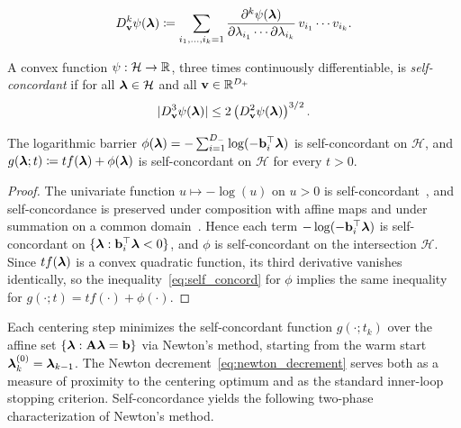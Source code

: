 \begin{equation}
	D_{\mathbf{v}}^k \psi(\boldsymbol{\lambda}) \coloneqq \sum_{i_1,\ldots,i_k=1}\frac{\partial^k\psi(\boldsymbol{\lambda})}{\partial \lambda_{i_1}\cdots \partial \lambda_{i_k}}\,v_{i_1}\cdots v_{i_k}.
\end{equation}
\begin{definition}
	A convex function $\psi:\mathcal{H}\rightarrow\mathbb{R}$, three times continuously differentiable, is \emph{self-concordant} if for all $\boldsymbol{\lambda}\in\mathcal{H}$ and all $\mathbf{v}\in\mathbb{R}^{D_+}$
\begin{equation}\label{eq:self_concord}
	|D_{\mathbf{v}}^3 \psi(\boldsymbol{\lambda})|\leq 2\left(D_{\mathbf{v}}^2\psi(\boldsymbol{\lambda})\right)^{3/2}.
\end{equation}
\end{definition}

\begin{lemma}\label{lemma:self_concord}
	The logarithmic barrier $\phi(\boldsymbol{\lambda}) = -\sum_{i=1}^{D_-}\log(-\mathbf{b}_i^\top\boldsymbol{\lambda})$ is self-concordant on $\mathcal{H}$, and $g(\boldsymbol{\lambda};t)\coloneqq tf(\boldsymbol{\lambda})+\phi(\boldsymbol{\lambda})$ is self-concordant on $\mathcal{H}$ for every $t>0$.
\end{lemma}
\begin{proof}
	The univariate function $u\mapsto -\log(u)$ on $u>0$ is self-concordant~\cite[Example 1]{nesterov1994interior}, and self-concordance is preserved under composition with affine maps and under summation on a common domain~\cite[Proposition 2.1.1]{nesterov1994interior}. Hence each term $-\log(-\mathbf{b}_i^\top\boldsymbol{\lambda})$ is self-concordant on $\{\boldsymbol{\lambda}:\mathbf{b}_i^\top\boldsymbol{\lambda}<0\}$, and $\phi$ is self-concordant on the intersection $\mathcal{H}$. Since $tf(\boldsymbol{\lambda})$ is a convex quadratic function, its third derivative vanishes identically, so the inequality~\eqref{eq:self_concord} for $\phi$ implies the same inequality for $g(\cdot;t)=tf(\cdot)+\phi(\cdot)$.
\end{proof}
Each centering step minimizes the self-concordant function $g(\cdot;t_k)$ over the affine set $\{\boldsymbol{\lambda}:\mathbf{A}\boldsymbol{\lambda}=\mathbf{b}\}$ via Newton's method, starting from the warm start $\boldsymbol{\lambda}_k^{(0)} = \boldsymbol{\lambda}_{k-1}$. The Newton decrement~\eqref{eq:newton_decrement} serves both as a measure of proximity to the centering optimum and as the standard inner-loop stopping criterion. Self-concordance yields the following two-phase characterization of Newton's method.

